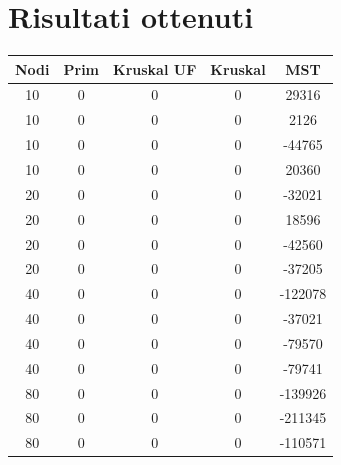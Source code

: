 \documentclass[a4paper]{article}
\begin{document}
\section{Risultati ottenuti}
\begin{table}[H]
\begin{minipage}[t]{10cm}
\vspace{0pt}
\begin{tabular}{|c|c|c|c|c|}
\rowcolor{gray!50}
\hline
\textbf{Nodi} & \textbf{Prim} & \textbf{Kruskal UF} & \textbf{Kruskal} & \textbf{MST} \\ \hline
10            & 0              & 0                   & 0                & 29316        \\ \hline
10            & 0              & 0                   & 0                & 2126         \\ \hline
10            & 0              & 0                   & 0                & -44765       \\ \hline
10            & 0              & 0                   & 0                & 20360        \\ \hline
20            & 0              & 0                   & 0                & -32021       \\ \hline
20            & 0              & 0                   & 0                & 18596        \\ \hline
20            & 0              & 0                   & 0                & -42560       \\ \hline
20            & 0              & 0                   & 0                & -37205       \\ \hline
40            & 0              & 0                   & 0                & -122078      \\ \hline
40            & 0              & 0                   & 0                & -37021       \\ \hline
40            & 0              & 0                   & 0                & -79570       \\ \hline
40            & 0              & 0                   & 0                & -79741       \\ \hline
80            & 0              & 0                   & 0                & -139926      \\ \hline
80            & 0              & 0                   & 0                & -211345      \\ \hline
80            & 0              & 0                   & 0                & -110571      \\ \hline

\end{tabular}
\end{minipage}
\end{table}
\end{document}
